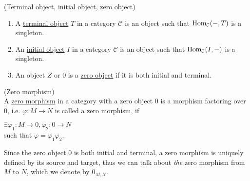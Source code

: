 \begin{remark}{(Terminal object, initial object, zero object)}\label{def:init_term_zero_object}
\renewcommand{\labelenumi}{(\theenumi)}
\begin{enumerate}
\item A \ul{terminal object} $T$ in a category $\mathcal{C}$ is an object such that $\textup{Hom}_{\mathcal{C}}(-,T)$ is a singleton.
\item An \ul{initial object} $I$ in a category $\mathcal{C}$ is an object such that $\textup{Hom}_{\mathcal{C}}(I,-)$ is a singleton.
\item An object $Z$ or $0$ is a \ul{zero object} if it is both initial and terminal.
\end{enumerate}
\end{remark}

\begin{definition}{(Zero morphism)}\label{def:zero_morphism}\\
A \ul{zero morphism} in a category with a zero object $0$ is a morphism factoring over $0$, i.e. $\varphi : M \rightarrow N$ is called a zero
morphism, if\\
\begin{minipage}{.35\textwidth}
\end{minipage}
\begin{minipage}{.65\textwidth}
$\exists \varphi_{1} : M \rightarrow 0, \varphi_{2} : 0 \rightarrow N$\\
such that $\varphi = \varphi_{1}\varphi_{2}$.
\end{minipage}
Since the zero object $0$ is both initial and terminal, a zero morphism is uniquely defined by its source and target, thus we can
talk about \textit{the} zero morphism from $M$ to $N$, which we denote by $0_{M,N}$.
\end{definition}

